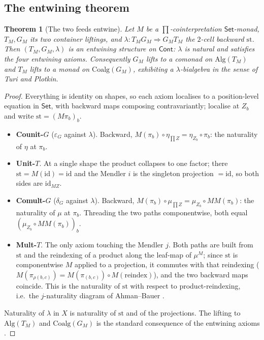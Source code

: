 \documentclass[11pt]{amsart}
\theoremstyle{plain}
\newtheorem{theorem}{Theorem}[section]
\theoremstyle{definition}
\theoremstyle{remark}
\newcommand{\Set}{\mathsf{Set}}
\newcommand{\Cont}{\mathsf{Cont}}
\newcommand{\Alg}{\mathrm{Alg}}
\newcommand{\Coalg}{\mathrm{Coalg}}
\newcommand{\id}{\mathrm{id}}
\newcommand{\str}{\mathrm{st}}
\begin{document}
\subsection{The entwining theorem}

\begin{theorem}[The two feeds entwine]\label{thm:entwine}
Let $M$ be a $\prod$-cointerpretation $\Set$-monad, $T_M,G_M$ its two container liftings, and
$\lambda\colon T_M G_M\Rightarrow G_M T_M$ the $2$-cell backward $\str$. Then $(T_M,G_M,
\lambda)$ is an entwining structure on $\Cont$: $\lambda$ is natural and satisfies the four
entwining axioms. Consequently $G_M$ lifts to a comonad on $\Alg(T_M)$ and $T_M$ lifts to a
monad on $\Coalg(G_M)$, exhibiting a $\lambda$-bialgebra in the sense of Turi and Plotkin.
\end{theorem}

\begin{proof}
Everything is identity on shapes, so each axiom localises to a position-level equation in
$\Set$, with backward maps composing contravariantly; localise at $Z_b$ and write
$\str=(M\pi_b)_b$.
\begin{itemize}
  \item \textbf{Counit-$G$} ($\varepsilon_G$ against $\lambda$). Backward,
  $M(\pi_b)\circ\eta_{\prod Z}=\eta_{Z_b}\circ\pi_b$: the naturality of $\eta$ at $\pi_b$.
  \item \textbf{Unit-$T$}. At a single shape the product collapses to one factor; there
  $\str=M(\id)=\id$ and the Mendler $i$ is the singleton projection $=\id$, so both sides are
  $\id_{MZ}$.
  \item \textbf{Comult-$G$} ($\delta_G$ against $\lambda$). Backward,
  $M(\pi_b)\circ\mu_{\prod Z}=\mu_{Z_b}\circ MM(\pi_b)$: the naturality of $\mu$ at $\pi_b$.
  Threading the two paths componentwise, both equal $(\mu_{Z_b}\circ MM(\pi_b))_b$.
  \item \textbf{Mult-$T$}. The only axiom touching the Mendler $j$. Both paths are built from
  $\str$ and the reindexing of a product along the leaf-map of $\mu^M$; since $\str$ is
  componentwise $M$ applied to a projection, it commutes with that reindexing
  ($M(\pi_{\rho(b,c)})=M(\pi_{(b,c)})\circ M(\text{reindex})$), and the two backward maps
  coincide. This is the naturality of $\str$ with respect to product-reindexing, i.e.\ the
  $j$-naturality diagram of Ahman--Bauer \cite[Def.~6.2]{AhmanBauer24}.
\end{itemize}
Naturality of $\lambda$ in $X$ is naturality of $\str$ and of the projections. The lifting to
$\Alg(T_M)$ and $\Coalg(G_M)$ is the standard consequence of the entwining axioms
\cite{PowerWatanabe02}.
\end{proof}
\end{document}
